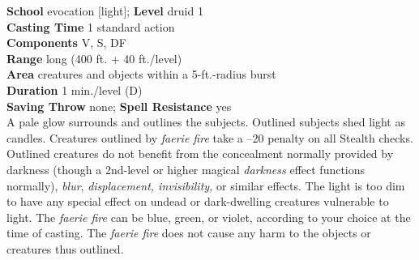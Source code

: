 \textbf{School} evocation [light]; \textbf{Level} druid 1\\
\textbf{Casting Time} 1 standard action\\
\textbf{Components} V, S, DF\\
\textbf{Range} long (400 ft. + 40 ft./level)\\
\textbf{Area} creatures and objects within a 5-ft.-radius burst\\
\textbf{Duration} 1 min./level (D)\\
\textbf{Saving Throw} none; \textbf{Spell Resistance} yes\\
A pale glow surrounds and outlines the subjects. Outlined subjects shed light as candles. Creatures outlined by \textit{faerie fire} take a --20 penalty on all Stealth checks. Outlined creatures do not benefit from the concealment normally provided by darkness (though a 2nd-level or higher magical \textit{darkness }effect functions normally), \textit{blur}, \textit{displacement, invisibility,} or similar effects. The light is too dim to have any special effect on undead or dark-dwelling creatures vulnerable to light. The \textit{faerie fire }can be blue, green, or violet, according to your choice at the time of casting. The \textit{faerie fire }does not cause any harm to the objects or creatures thus outlined.\\
